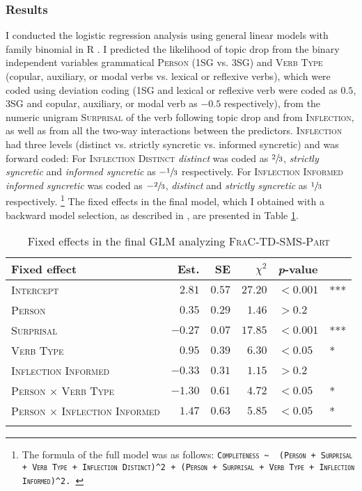 \subsubsection{Results}\label{sec:corpus.inference.results}
I conducted the logistic regression analysis using general linear models with family binomial in R \citep{rcoreteam2021}.
I predicted the likelihood of topic drop from the binary independent variables grammatical \textsc{Person}  (1SG vs. 3SG) and \textsc{Verb Type} (copular, auxiliary, or modal verbs vs. lexical or reflexive verbs), which were coded using deviation coding (1SG and lexical or reflexive verb were coded as $0.5$, 3SG and copular, auxiliary, or modal verb as $-0.5$ respectively), from the numeric unigram \textsc{Surprisal} of the verb following topic drop and from \textsc{Inflection}, as well as from all the two-way interactions between the predictors.
\textsc{Inflection} had three levels (distinct vs. strictly syncretic vs. informed syncretic) and was forward coded:
For \textsc{Inflection Distinct} \textit{distinct} was coded as $\sfrac{2}{3}$, \textit{strictly syncretic} and \textit{informed syncretic} as $-\sfrac{1}{3}$  respectively.
For \textsc{Inflection Informed} \textit{informed syncretic} was coded as $-\sfrac{2}{3}$, \textit{distinct} and \textit{strictly syncretic} as $\sfrac{1}{3}$ respectively.%
\footnote{The formula of the full model was as follows:
\texttt{\textsc{Completeness} \textasciitilde~  (\textsc{Person} + \textsc{Surprisal} + \textsc{Verb Type} + \textsc{Inflection Distinct})\textasciicircum2 + (\textsc{Person} + \textsc{Surprisal} + \textsc{Verb Type} + \textsc{Inflection Informed})\textasciicircum2.
}}
%
The fixed effects in the final model, which I obtained with a backward model selection, as described in , are presented in Table \ref{tab:frac.mess.part.model}.

\begin{table}
\centering
\caption{Fixed effects in the final GLM analyzing \textsc{FraC}‑TD‑SMS‑\textsc{Part}}
\begin{tabular}{lrrrll}
\lsptoprule
Fixed effect & Est. & SE & $\chi^2$ & \textit{p}-value &   \\
\midrule
\textsc{Intercept} & $2.81$ & $0.57$ & $27.20$ & $< 0.001$ & ***\\
\textsc{Person} & $0.35$ & $0.29$ & $1.46$ & $> 0.2$ & \\
\textsc{Surprisal} & $-0.27$ & $0.07$ & $17.85$ & $< 0.001$ & ***\\
\textsc{Verb Type} & $0.95$ & $0.39$ & $6.30$ & $< 0.05$ & *\\
\textsc{Inflection Informed} & $-0.33$ & $0.31$ & $1.15$ & $> 0.2$ & \\
\textsc{Person $\times$ Verb Type} & $-1.30$ & $0.61$ & $4.72$ & $< 0.05$ & *\\
\textsc{Person $\times$ Inflection Informed} & $1.47$ & $0.63$ & $5.85$ & $< 0.05$ & *\\
\lspbottomrule
\end{tabular}
\label{tab:frac.mess.part.model}
\end{table}

